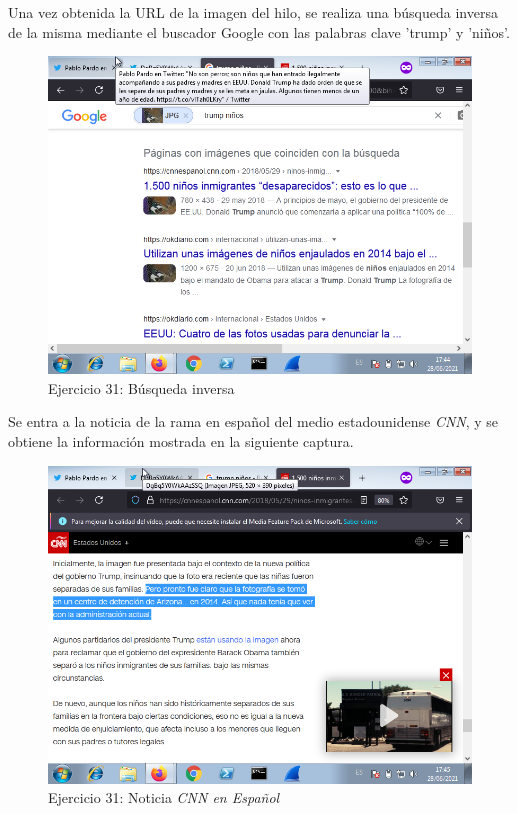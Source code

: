 \documentclass[11pt]{article}
\begin{document}
Una vez obtenida la URL de la imagen del hilo, se realiza una búsqueda inversa de la misma mediante el buscador Google con las palabras clave 'trump' y 'niños'.

\begin{figure}[H]
    \caption{Ejercicio 31: Búsqueda inversa}
  \centering
    \includegraphics[scale=0.8]{p05/e31-2.png}
\end{figure}

Se entra a la noticia de la rama en español del medio estadounidense \textit{CNN}, y se obtiene la información mostrada en la siguiente captura.

\begin{figure}[H]
    \caption{Ejercicio 31: Noticia \textit{CNN en Español}}
  \centering
    \includegraphics[scale=0.8]{p05/e31-3.png}
\end{figure}
\end{document}
